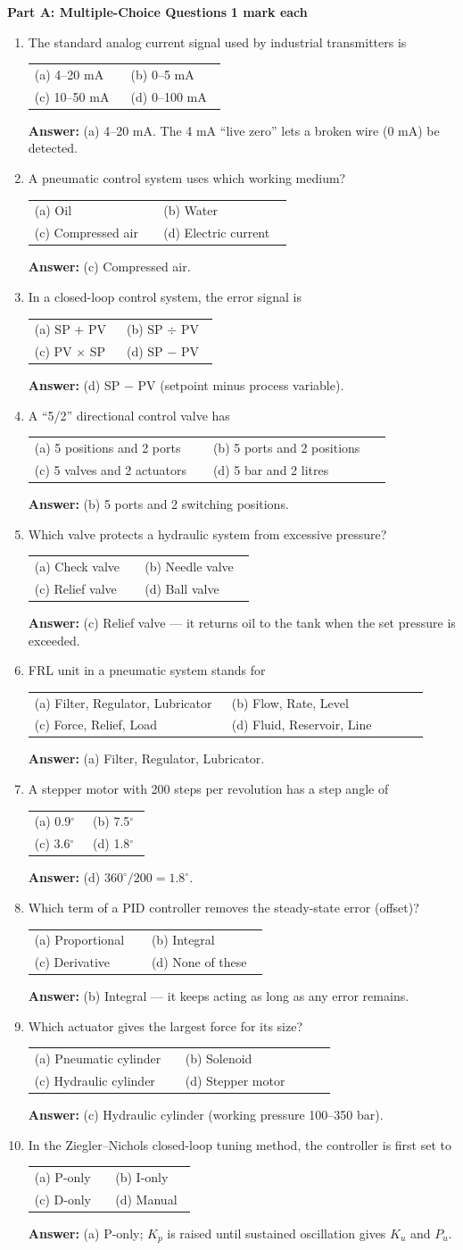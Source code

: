 \documentclass[11pt,a4paper]{article}
\makeatletter
\newcommand{\opts}[4]{%
	\par\smallskip
	\begin{tabular}{@{}p{0.46\linewidth}p{0.46\linewidth}@{}}
		(a) #1 & (b) #2 \\
		(c) #3 & (d) #4 \\
	\end{tabular}\par}
\newcommand{\ans}[1]{%
	\par\smallskip
	{\color{cGreen!50!black}\textbf{Answer:} #1}\par\medskip}
\newcommand{\partheading}[2]{%
	\bigskip
	\begin{tcolorbox}[colback=cAccent!10, colframe=cAccent, boxrule=0.6pt, arc=2pt, left=6pt, top=3pt, bottom=3pt]
		\textbf{\large #1} \hfill \textbf{#2}
	\end{tcolorbox}}
\makeatother
\begin{document}
	\partheading{Part A: Multiple-Choice Questions}{1 mark each}
	\begin{enumerate}

		\item The standard analog current signal used by industrial transmitters is
		\opts{4--20 mA}{0--5 mA}{10--50 mA}{0--100 mA}
		\ans{(a) 4--20 mA. The 4 mA ``live zero'' lets a broken wire (0 mA) be detected.}

		\item A pneumatic control system uses which working medium?
		\opts{Oil}{Water}{Compressed air}{Electric current}
		\ans{(c) Compressed air.}

		\item In a closed-loop control system, the error signal is
		\opts{SP $+$ PV}{SP $\div$ PV}{PV $\times$ SP}{SP $-$ PV}
		\ans{(d) SP $-$ PV (setpoint minus process variable).}

		\item A ``5/2'' directional control valve has
		\opts{5 positions and 2 ports}{5 ports and 2 positions}{5 valves and 2 actuators}{5 bar and 2 litres}
		\ans{(b) 5 ports and 2 switching positions.}

		\item Which valve protects a hydraulic system from excessive pressure?
		\opts{Check valve}{Needle valve}{Relief valve}{Ball valve}
		\ans{(c) Relief valve --- it returns oil to the tank when the set pressure is exceeded.}

		\item FRL unit in a pneumatic system stands for
		\opts{Filter, Regulator, Lubricator}{Flow, Rate, Level}{Force, Relief, Load}{Fluid, Reservoir, Line}
		\ans{(a) Filter, Regulator, Lubricator.}

		\item A stepper motor with 200 steps per revolution has a step angle of
		\opts{0.9$^\circ$}{7.5$^\circ$}{3.6$^\circ$}{1.8$^\circ$}
		\ans{(d) $360^\circ/200 = 1.8^\circ$.}

		\item Which term of a PID controller removes the steady-state error (offset)?
		\opts{Proportional}{Integral}{Derivative}{None of these}
		\ans{(b) Integral --- it keeps acting as long as any error remains.}

		\item Which actuator gives the largest force for its size?
		\opts{Pneumatic cylinder}{Solenoid}{Hydraulic cylinder}{Stepper motor}
		\ans{(c) Hydraulic cylinder (working pressure 100--350 bar).}

		\item In the Ziegler--Nichols closed-loop tuning method, the controller is first set to
		\opts{P-only}{I-only}{D-only}{Manual}
		\ans{(a) P-only; $K_p$ is raised until sustained oscillation gives $K_u$ and $P_u$.}

	\end{enumerate}
\end{document}
